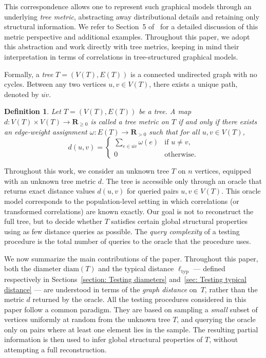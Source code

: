\documentclass[12pt]{article}
\newtheorem{definition}[theorem]{Definition}
\newcommand{\R}{\mathbf{R}}
\newcommand{\diam}[1]{\mathrm{diam}\!\left(#1\right)}
\begin{document}
This correspondence allows one to represent such graphical models through an underlying \emph{tree metric}, abstracting away distributional details and retaining only structural information.
We refer to Section~5 of~\cite{DeLuZw24} for a detailed discussion of this metric perspective and additional examples.
Throughout this paper, we adopt this abstraction and work directly with tree metrics, keeping in mind their interpretation in terms of correlations in tree-structured graphical models.

Formally, a \emph{tree} \(T = (V(T), E(T))\) is a connected undirected graph with no cycles.
Between any two vertices \(u, v \in V(T)\), there exists a unique path, denoted by \(\overline{uv}\).

\begin{definition}
    Let \(T=(V(T),E(T))\) be a tree. 
    A map \(d : V(T)\times V(T) \to \R_{\ge 0}\) is called a \emph{tree metric} on \(T\) if and only if there exists an edge-weight assignment \(\omega : E(T)\to \R_{>0}\) such that for all \(u,v\in V(T)\),
    \[
        d(u,v)=
        \begin{cases}
            \sum_{e\in\overline{uv}}\omega(e) & \text{if } u\neq v,\\
            0 & \text{otherwise}.
        \end{cases}
    \]
\end{definition}

Throughout this work, we consider an unknown tree \(T\) on \(n\) vertices, equipped with an unknown tree metric \(d\).
The tree is accessible only through an oracle that returns exact distance values \(d(u,v)\) for queried pairs \(u,v \in V(T)\).
This oracle model corresponds to the population-level setting in which correlations (or transformed correlations) are known exactly.
Our goal is not to reconstruct the full tree, but to decide whether \(T\) satisfies certain global structural properties using as few distance queries as possible. The \emph{query complexity} of a testing procedure is the total number of queries to the oracle 
that the procedure uses.



We now summarize the main contributions of the paper.  
Throughout this paper, both the diameter \(\diam{T}\) and the typical distance \(\ell_{\mathrm{typ}}\) — defined respectively in Sections~\ref{section: Testing diameters} and~\ref{sec: Testing typical distance} — are understood in terms of the \emph{graph distance} on~\(T\), rather than the metric \(d\) returned by the oracle. 
All the testing procedures considered in this paper follow a common paradigm.
They are based on sampling a \emph{small} subset of vertices uniformly at random from the unknown tree \(T\), and querying the oracle only on pairs where at least one element lies in the sample.
The resulting partial information is then used to infer global structural properties of \(T\), without attempting a full reconstruction.
\end{document}
